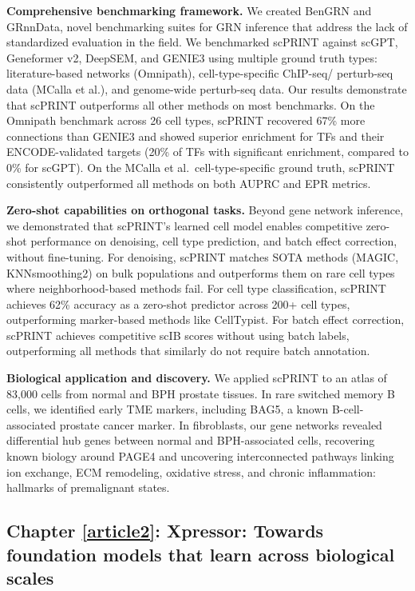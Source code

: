 \textbf{Comprehensive benchmarking framework.} We created BenGRN and GRnnData, novel benchmarking
suites for \gls{GRN} inference that address the lack of standardized evaluation in the field. We
benchmarked \gls{scPRINT} against \gls{scGPT}, Geneformer v2, DeepSEM, and GENIE3 using multiple
ground truth types: literature-based networks (Omnipath), cell-type-specific \gls{ChIP-seq}/
perturb-seq data (MCalla et al.), and genome-wide perturb-seq data. Our results
demonstrate that \gls{scPRINT} outperforms all other methods on most benchmarks. On the Omnipath
benchmark across 26 cell types, \gls{scPRINT} recovered 67\% more connections than GENIE3 and
showed superior enrichment for \glspl{TF} and their \gls{ENCODE}-validated targets (20\% of
\glspl{TF} with significant enrichment, compared to 0\% for \gls{scGPT}). On the MCalla et al.\
cell-type-specific ground truth, \gls{scPRINT} consistently outperformed all methods on both
\gls{AUPRC} and \gls{EPR} metrics.

\textbf{Zero-shot capabilities on orthogonal tasks.} Beyond gene network inference, we
demonstrated that \gls{scPRINT}'s learned cell model enables competitive zero-shot performance on
denoising, cell type prediction, and batch effect correction, without fine-tuning. For denoising,
\gls{scPRINT} matches \gls{SOTA} methods (MAGIC, KNNsmoothing2) on bulk populations and
outperforms them on rare cell types where neighborhood-based methods fail. For cell type
classification, \gls{scPRINT} achieves 62\% accuracy as a zero-shot predictor across 200+ cell
types, outperforming marker-based methods like CellTypist. For batch effect correction,
\gls{scPRINT} achieves competitive \gls{scIB} scores without using batch labels, outperforming all
methods that similarly do not require batch annotation.

\textbf{Biological application and discovery.} We applied \gls{scPRINT} to an atlas of 83,000
cells from normal and \gls{BPH} prostate tissues. In rare switched memory B cells, we identified
early \gls{TME} markers, including BAG5, a known B-cell-associated prostate cancer marker. In
fibroblasts, our gene networks revealed differential hub genes between normal and
\gls{BPH}-associated cells, recovering known biology around PAGE4 and uncovering interconnected
pathways linking ion exchange, \gls{ECM} remodeling, oxidative stress, and chronic
inflammation: hallmarks of premalignant states.

\subsection{Chapter \ref{article2}: Xpressor: Towards foundation models that learn across biological scales}


